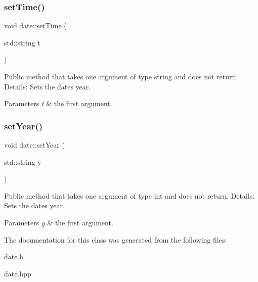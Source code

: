\subsubsection{\texorpdfstring{set\+Time()}{setTime()}}
{\footnotesize\ttfamily void date\+::set\+Time (\begin{DoxyParamCaption}\item[{std\+::string}]{t }\end{DoxyParamCaption})}

Public method that takes one argument of type string and does not return. Details\+: Sets the date\textquotesingle{}s year. 
\begin{DoxyParams}{Parameters}
{\em t} & the first argument. \\
\hline
\end{DoxyParams}
\mbox{\label{classdate_a768f9154bd836be32a85f6b75867698a}} 
\subsubsection{\texorpdfstring{set\+Year()}{setYear()}}
{\footnotesize\ttfamily void date\+::set\+Year (\begin{DoxyParamCaption}\item[{std\+::string}]{y }\end{DoxyParamCaption})}

Public method that takes one argument of type int and does not return. Details\+: Sets the date\textquotesingle{}s year. 
\begin{DoxyParams}{Parameters}
{\em y} & the first argument. \\
\hline
\end{DoxyParams}


The documentation for this class was generated from the following files\+:\begin{DoxyCompactItemize}
\item 
date.\+h\item 
date.\+hpp\end{DoxyCompactItemize}
